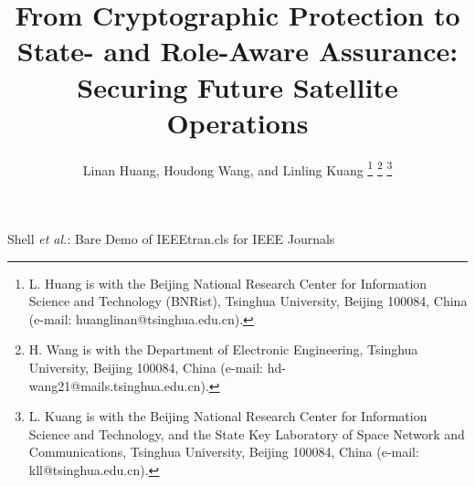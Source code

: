 \documentclass[journal]{IEEEtran}
\begin{document}
%
\title{
From Cryptographic Protection to State- and Role-Aware Assurance: Securing Future Satellite Operations 
} 

\author{
Linan Huang, %
Houdong Wang, 
and Linling Kuang  
\thanks{L. Huang is with the Beijing National Research Center for Information Science and Technology (BNRist), Tsinghua University, Beijing 100084, China (e-mail: huanglinan@tsinghua.edu.cn).}%
\thanks{H. Wang is with the Department of Electronic Engineering, Tsinghua University, Beijing 100084, China (e-mail: hd-wang21@mails.tsinghua.edu.cn).}%
\thanks{L. Kuang is with the Beijing National Research Center for Information Science and Technology, and the State Key Laboratory of Space Network and Communications, Tsinghua University, Beijing 100084, China (e-mail: kll@tsinghua.edu.cn).}
}


%
{Shell \MakeLowercase{\textit{et al.}}: Bare Demo of IEEEtran.cls for IEEE Journals}
% 







\end{document}
